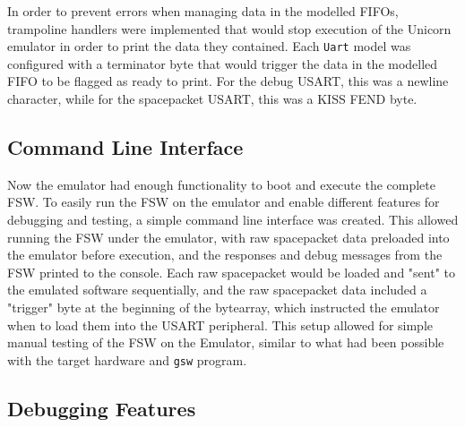 \documentclass[../report.tex]{subfiles}
\begin{document}
In order to prevent errors when managing data in the modelled FIFOs, trampoline
handlers were implemented that would stop execution of the Unicorn emulator in
order to print the data they contained. Each \lstinline|Uart| model was
configured with a terminator byte that would trigger the data in the modelled
FIFO to be flagged as ready to print. For the debug USART, this was a newline
character, while for the spacepacket USART, this was a KISS FEND byte.

\subsection{Command Line Interface}

Now the emulator had enough functionality to boot and execute the complete FSW.
To easily run the FSW on the emulator and enable different features for
debugging and testing, a simple command line interface was created. This allowed
running the FSW under the emulator, with raw spacepacket data preloaded into
the emulator before execution, and the responses and debug messages from the
FSW printed to the console. Each raw spacepacket would be loaded and "sent" to
the emulated software sequentially, and the raw spacepacket data included a
"trigger" byte at the beginning of the bytearray, which instructed the emulator
when to load them into the USART peripheral. This setup allowed for simple
manual testing of the FSW on the Emulator, similar to what had been possible
with the target hardware and \lstinline|gsw| program.

\subsection{Debugging Features}
\end{document}
